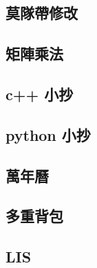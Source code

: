 \subsection{莫隊帶修改}

\subsection{矩陣乘法}

\subsection{c++ 小抄}

\subsection{python 小抄}

\subsection{萬年曆}

\subsection{多重背包}

\subsection{LIS}

